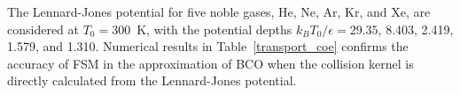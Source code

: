 





The Lennard-Jones potential for five noble gases, He, Ne, Ar, Kr, and Xe, are considered at $T_0=300$~K, with the potential depths $k_BT_0/\epsilon=29.35$, 8.403, 2.419, 1.579, and 1.310. Numerical results in Table~\ref{transport_coe} confirms the accuracy of FSM in the approximation of BCO when the collision kernel is directly calculated from the Lennard-Jones potential. 


